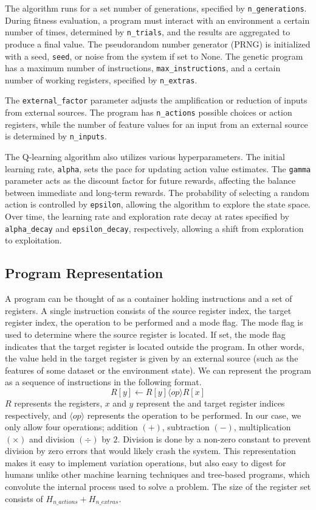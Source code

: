 \documentclass[12pt]{report}
\begin{document}
The algorithm runs for a set number of generations, specified by \texttt{n\_generations}. During fitness evaluation, a program must interact with an environment a certain number of times, determined by \texttt{n\_trials}, and the results are aggregated to produce a final value. The pseudorandom number generator (PRNG) is initialized with a seed, \texttt{seed}, or noise from the system if set to None. The genetic program has a maximum number of instructions, \texttt{max\_instructions}, and a certain number of working registers, specified by \texttt{n\_extras}.

The \texttt{external\_factor} parameter adjusts the amplification or reduction of inputs from external sources. The program has \texttt{n\_actions} possible choices or action registers, while the number of feature values for an input from an external source is determined by \texttt{n\_inputs}.

The Q-learning algorithm also utilizes various hyperparameters. The initial learning rate, \texttt{alpha}, sets the pace for updating action value estimates. The \texttt{gamma} parameter acts as the discount factor for future rewards, affecting the balance between immediate and long-term rewards. The probability of selecting a random action is controlled by \texttt{epsilon}, allowing the algorithm to explore the state space. Over time, the learning rate and exploration rate decay at rates specified by \texttt{alpha\_decay} and \texttt{epsilon\_decay}, respectively, allowing a shift from exploration to exploitation.

\subsection{Program Representation}
A program can be thought of as a container holding instructions and a set of registers. A single instruction consists of the source register index, the target register index, the operation to be performed and a mode flag. The mode flag is used to determine where the source register is located. If set, the mode flag indicates that the target register is located outside the program. In other words, the value held in the target register is given by an external source (such as the features of some dataset or the environment state). We can represent the program as a sequence of instructions in the following format.
\begin{equation}
	R[y] \leftarrow R[y] \langle op \rangle  R[x]
\end{equation}
$R$ represents the registers, $x$ and $y$ represent the and target register indices respectively, and $\langle op \rangle$ represents the operation to be performed. In our case, we only allow four operations; addition $(+)$,
subtraction $(-)$, multiplication $(\times)$ and division $(\div)$ by $2$. Division is done by a non-zero constant to prevent division by zero errors that would likely crash the system. This representation makes it easy to implement variation operations, but also easy to digest for humans unlike other machine learning techniques and tree-based programs, which convolute the internal process used to solve a problem. The size of the register set consists of $H_{n\_actions} +  H_{n\_extras}$.
\end{document}
